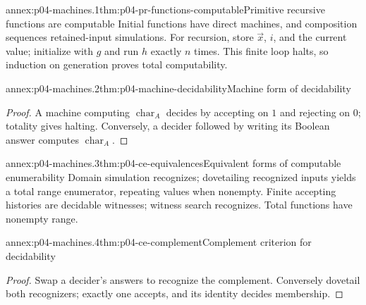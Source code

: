 
\begin{annexitem}{annex:p04-machines.1}{thm:p04-pr-functions-computable}{Primitive recursive functions are computable}
Initial functions have direct machines, and composition sequences retained-input
simulations.  For recursion, store \(\vec x\), \(i\), and the current value;
initialize with \(g\) and run \(h\) exactly \(n\) times.  This finite loop
halts, so induction on generation proves total computability.
\end{annexitem}

\begin{annexitem}{annex:p04-machines.2}{thm:p04-machine-decidability}{Machine form of decidability}
\begin{proof}
A machine computing \(\operatorname{char}_A\) decides by accepting on \(1\) and rejecting on
\(0\); totality gives halting.  Conversely, a decider followed by writing its
Boolean answer computes \(\operatorname{char}_A\).
\end{proof}
\end{annexitem}

\begin{annexitem}{annex:p04-machines.3}{thm:p04-ce-equivalences}{Equivalent forms of computable enumerability}
Domain simulation recognizes; dovetailing recognized inputs yields a total
range enumerator, repeating values when nonempty.  Finite accepting histories
are decidable witnesses; witness search recognizes.  Total functions have
nonempty range.
\end{annexitem}

\begin{annexitem}{annex:p04-machines.4}{thm:p04-ce-complement}{Complement criterion for decidability}
\begin{proof}
Swap a decider's answers to recognize the complement.  Conversely dovetail
both recognizers; exactly one accepts, and its identity decides membership.
\end{proof}
\end{annexitem}
